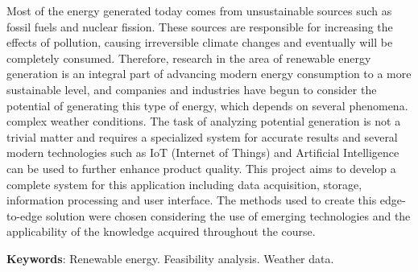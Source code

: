 \documentclass[../../layout.tex]{subfiles}
\begin{document}
\begin{resumo}[Abstract]
\hspace*{3em}
Most of the energy generated today comes from unsustainable sources such as fossil fuels and nuclear fission. These sources are responsible for increasing the effects of pollution, causing irreversible climate changes and eventually will be completely consumed. Therefore, research in the area of renewable energy generation is an integral part of advancing modern energy consumption to a more sustainable level, and companies and industries have begun to consider the potential of generating this type of energy, which depends on several phenomena. complex weather conditions. The task of analyzing potential generation is not a trivial matter and requires a specialized system for accurate results and several modern technologies such as IoT (Internet of Things) and Artificial Intelligence can be used to further enhance product quality. This project aims to develop a complete system for this application including data acquisition, storage, information processing and user interface. The methods used to create this edge-to-edge solution were chosen considering the use of emerging technologies and the applicability of the knowledge acquired throughout the course.
\vspace{\onelineskip}

\noindent
\textbf{Keywords}: Renewable energy. Feasibility analysis. Weather data.
\end{resumo}
\end{document}
